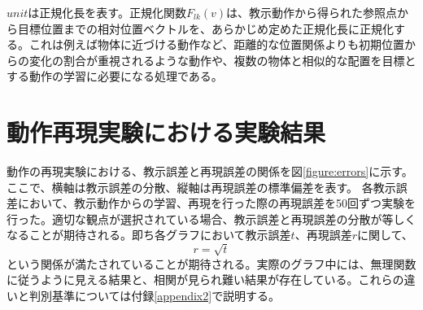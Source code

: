 $unit$は正規化長を表す。正規化関数$F_{lk}(v)$は、教示動作から得られた参照点から目標位置までの相対位置ベクトルを、あらかじめ定めた正規化長に正規化する。これは例えば物体に近づける動作など、距離的な位置関係よりも初期位置からの変化の割合が重視されるような動作や、複数の物体と相似的な配置を目標とする動作の学習に必要になる処理である。




\chapter{動作再現実験における実験結果}\label{appendix1}

動作の再現実験における、教示誤差と再現誤差の関係を図\ref{figure:errors}に示す。
ここで、横軸は教示誤差の分散、縦軸は再現誤差の標準偏差を表す。
各教示誤差において、教示動作からの学習、再現を行った際の再現誤差を50回ずつ実験を行った。適切な観点が選択されている場合、教示誤差と再現誤差の分散が等しくなることが期待される。即ち各グラフにおいて教示誤差$t$、再現誤差$r$に関して、
\[
	r = \sqrt{t}
\]
という関係が満たされていることが期待される。実際のグラフ中には、無理関数に従うように見える結果と、相関が見られ難い結果が存在している。これらの違いと判別基準については付録\ref{appendix2}で説明する。

